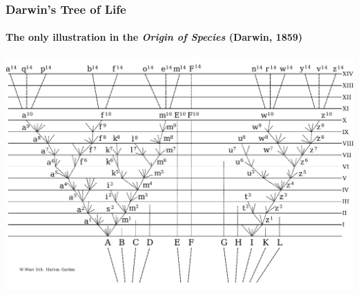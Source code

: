 \begin{frame}
\frametitle{Darwin's Tree of Life}
\framesubtitle{The only illustration in the \textit{Origin of Species} (Darwin, 1859)}

\includegraphics[width=\textwidth]{../images/Origin_of_Species}

\end{frame}


